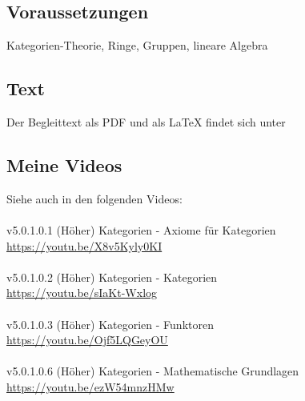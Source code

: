 \documentclass[a4paper]{amsart}
\theoremstyle{definition}
\begin{document}
\subsection*{Voraussetzungen}
Kategorien-Theorie, Ringe, Gruppen, lineare Algebra

\subsection*{Text}
Der Begleittext als PDF und als LaTeX findet sich unter
{\tiny
   \url{}
}

\subsection*{Meine Videos}
Siehe auch in den folgenden Videos:\\
\\
v5.0.1.0.1 (Höher) Kategorien - Axiome für Kategorien\\
\url{https://youtu.be/X8v5Kyly0KI}\\
\\
v5.0.1.0.2 (Höher) Kategorien - Kategorien\\
\url{https://youtu.be/sIaKt-Wxlog}\\
\\
v5.0.1.0.3 (Höher) Kategorien - Funktoren\\
\url{https://youtu.be/Ojf5LQGeyOU}\\
\\
v5.0.1.0.6 (Höher) Kategorien - Mathematische Grundlagen\\
\url{https://youtu.be/ezW54mnzHMw}

\end{document}
